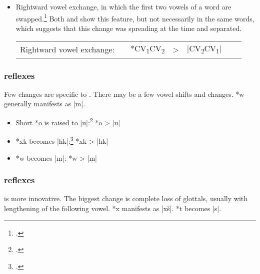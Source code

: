 \documentclass[output=paper]{LSP/langsci}
\begin{document}
\begin{itemize}
\item Rightward vowel exchange, in which the first two vowels of a word are swapped.\footnote{\citealt[193, 788]{Rankinetal2006PDF}.}  Both  and  show this feature, but not necessarily in the same words, which suggests that this change was spreading at the time  and  separated.



\begin{tabular}[t]{c c c c c c c}
Rightward vowel exchange:	 & & *CV\textsubscript{1}CV\textsubscript{2} & > & |CV\textsubscript{2}CV\textsubscript{1}|	
\end{tabular}
\end{itemize}

\subsubsection{ reflexes}

Few changes are specific to .  There may be a few vowel shifts and  changes.   *w generally manifests as |m|.

\begin{itemize}
\item Short *o is raised to |u|:\footnote{\citealt[137, 922]{Rankinetal2006PDF}.}	 \hspace{1em} *o	>	|u|
\item *xk becomes |hk|:\footnote{\citealt[193]{Rankinetal2006PDF}.} \hspace{3.2em}  *xk	>	|hk|
\item *w becomes |m|: \hspace{4.1em} *w	>	|m|
\end{itemize}

\subsubsection{ reflexes}

 is more innovative.  The biggest change is complete loss of glottals, usually with lengthening of the following vowel.   *x manifests as |xš|.   *t becomes |s|.
\end{document}
